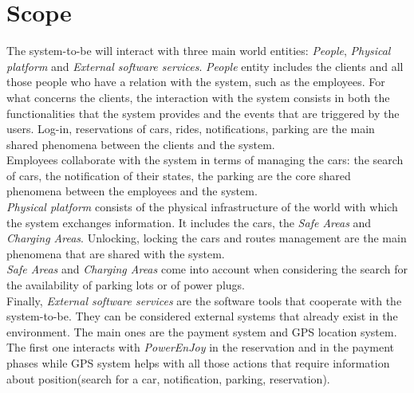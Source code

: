 \documentclass[11pt,a4paper]{report}
\begin{document}
\section{Scope}
The system-to-be will interact with three main world entities: \textit{People}, \textit{Physical platform} and \textit{External software services}.
\textit{People} entity includes the clients and all those people who have a relation with the system, such as the employees.
For what concerns the clients, the interaction with the system consists in both the functionalities that the system provides and the events that are triggered by the users. Log-in, reservations of cars, rides, notifications, parking are the main shared phenomena between the clients and the system.\\Employees collaborate with the system in terms of managing the cars: the search of cars, the notification of their states, the parking are the core shared phenomena between the employees and the system.\\
\textit{Physical platform} consists of the physical infrastructure of the world with which the system exchanges information. It includes the cars, the \textit{Safe Areas} and \textit{Charging Areas}.
Unlocking, locking the cars and routes management are the main phenomena that are shared with the system.\\\textit{Safe Areas} and \textit{Charging Areas} come into account when considering the search for the availability of parking lots or of power plugs.\\Finally, \textit{External software services} are the software tools that cooperate with the system-to-be. They can be considered external systems that already exist in the environment. The main ones are the payment system and GPS location system. The first one interacts with \textit{PowerEnJoy} in the reservation and in the payment phases while GPS system helps with all those actions that require information about position(search for a car, notification, parking, reservation).
\end{document}
